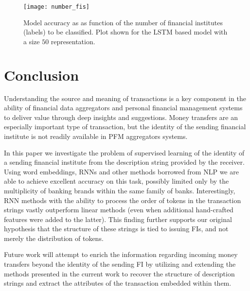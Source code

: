 \documentclass[sigconf]{acmart}
\begin{document}
\begin{figure}
\centering{}
\texttt{[image: number\_fis]}
\caption{Model accuracy as as function of the number of financial institutes (labels) to be classified. Plot shown for the LSTM based model with a size $50$ representation.}
\label{fig:nfi}
\end{figure}


\section{Conclusion}
Understanding the source and meaning of transactions is a key component in the ability of financial data aggregators and personal financial management systems to deliver value through deep insights and suggestions. Money transfers are an especially important type of transaction, but the identity of the sending financial institute is not readily available in PFM aggregators systems. 

In this paper we investigate the problem of supervised learning of the identity of a sending financial institute from the description string provided by the receiver. Using word embeddings, RNNs and other methods borrowed from NLP we are able to achieve excellent accuracy on this task, possibly limited only by the multiplicity of banking brands within the same family of banks. Interestingly, RNN methods with the ability to process the order of tokens in the transaction strings vastly outperform linear methods (even when additional hand-crafted features were added to the latter). This finding further supports our original hypothesis that the structure of these strings is tied to issuing FIs, and not merely the distribution of tokens. 

Future work will attempt to enrich the information regarding incoming money transfers beyond the identity of the sending FI by utilizing and extending the methods presented in the current work to recover the structure of description strings and extract the attributes of the transaction embedded within them.   




\end{document}
